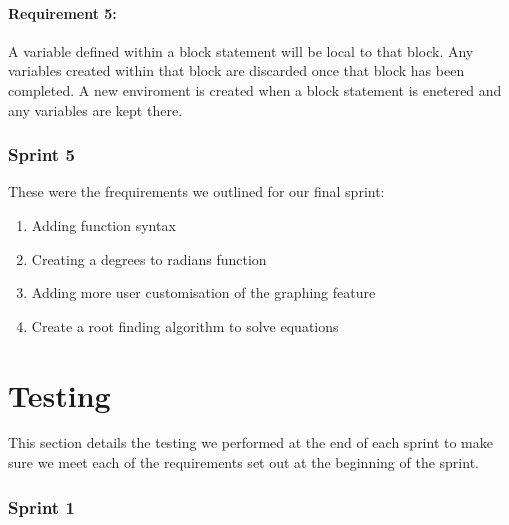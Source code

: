 \documentclass[a4paper, oneside, 11pt]{report}
\begin{document}
\subsubsection{Requirement 5: }
A variable defined within a block statement will be local to that block. Any variables created within that block are discarded once that block has been completed. A new enviroment is created when a block statement is enetered and any variables are kept there.

\subsection{Sprint 5}
These were the frequirements we outlined for our final sprint:
\begin{enumerate}
\item Adding function syntax
\item Creating a degrees to radians function
\item Adding more user customisation of the graphing feature
\item Create a root finding algorithm to solve equations
\end{enumerate}


\chapter{Testing}

This section details the testing we performed at the end of each sprint to make sure we meet each of the requirements set out at the beginning of the sprint.

\subsection{Sprint 1}
\end{document}
